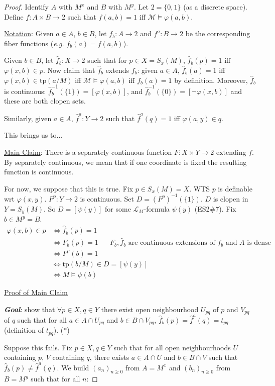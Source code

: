 \documentclass[]{article}
\theoremstyle{custhm}
\theoremstyle{cusdef}
\theoremstyle{custhm}
\theoremstyle{custhm}
\theoremstyle{custhm}
\theoremstyle{ex}
\theoremstyle{custhm}
\theoremstyle{cusdef}
\theoremstyle{remark}
\theoremstyle{remark}
\theoremstyle{numremark}
\newcommand{\ra}{\rightarrow}
\newcommand{\undf}[1]{\textit{\textbf{#1}}}
\renewcommand{\L}{\mathcal{L}}
\renewcommand{\it}[1]{\textit{#1}}
\newcommand{\M}{\mathcal{M}}
\renewcommand{\phi}{\varphi}
\newcommand{\tp}{\textrm{tp}}
\begin{document}
\begin{proof}
	Identify $A$ with $M^x$ and $B$ with $M^y$. Let $2 = \{0,1\}$ (as a discrete space). Define $f:A\times B\ra 2$ such that $f(a,b) = 1$ iff $\M\models \phi(a,b)$.

	\underline{Notation}: Given $a\in A$, $b\in B$, let $f_b:A\ra 2$ and $f^a:B\ra 2$ be the corresponding fiber functions (\it{e.g.} $f_b(a) = f(a,b)$).

	Given $b\in B$, let $\hat{f}_b:X\ra 2$ such that for $p \in X=S_x(M)$, $\hat{f}_b(p) = 1$ iff $\phi(x,b)\in p$. Now claim that $\hat{f}_b$ extends $f_b$: given $a\in A$, $\hat{f}_b(a) = 1$ iff $\phi(x,b)\in \tp(a/M)$ iff $\M\models \phi(a,b)$ iff $f_b(a) = 1$ by definition. Moreover, $\hat{f}_b$ is continuous: $\hat{f}_b^{-1}(\{1\}) = [\phi(x,b)]$, and $\hat{f}_b^{-1}(\{0\}) = [\neg\phi(x,b)]$ and these are both clopen sets.

	Similarly, given $a \in A$, $\hat{f}^a:Y\ra 2$ such that $\hat{f}^a(q) = 1$ iff $\phi(a,y)\in q$.

	This brings us to...

	\underline{Main Claim}: There is a separately continuous function $F:X\times Y\ra 2$ extending $f$. By separately continuous, we mean that if one coordinate is fixed the resulting function is continuous.

	For now, we suppose that this is true. Fix $ p \in S_x(M) = X$. WTS $p$ is definable wrt $\phi(x,y)$. $F^p:Y\ra 2$ is continuous. Set $D = (F^p)^{-1}(\{1\})$. $D$ is clopen in $Y = S_y(M)$. So $D = [\psi(y)]$ for some $\L_M$-formula $\psi(y)$ (ES2\#7). Fix $b\in M^y = B$.
	\begin{align*}
		\phi(x,b)\in p &\iff \hat{f}_b(p)=1\\
		&\iff F_b(p) = 1\quad \textrm{ $F_b,\hat{f}_b$ are continuous extensions of $f_b$ and $A$ is dense}\\
		&\iff F^p(b)=1\\
		&\iff \tp(b/M)\in D = [\psi(y)]\\
		&\iff M\models \psi(b)
	\end{align*}

	\underline{Proof of Main Claim}

	\undf{Goal}: show that $\forall p \in X,q\in Y$ there exist open neighbourhood $U_{pq}$ of $p$ and $V_{pq}$ of $q$ such that for all $a\in A\cap U_{pq}$ and $b\in B\cap V_{pq}$, $\hat{f}_b(p) = \hat{f}^a(q)=t_{pq}$ (definition of $t_{pq}$). ($\ast$)

	Suppose this fails. Fix $p\in X, q\in Y$ such that for all open neighbourhoods $U$ containing $p$, $V$ containing $q$, there exists $a\in A\cap U$ and $b\in B\cap V$ such that $\hat{f}_b(p)\ne \hat{f}^a(q)$. We build $(a_n)_{n\ge 0}$ from $A = M^x$ and $(b_n)_{n\ge 0}$ from $B = M^y$ such that for all $n$:


\end{proof}
\end{document}
